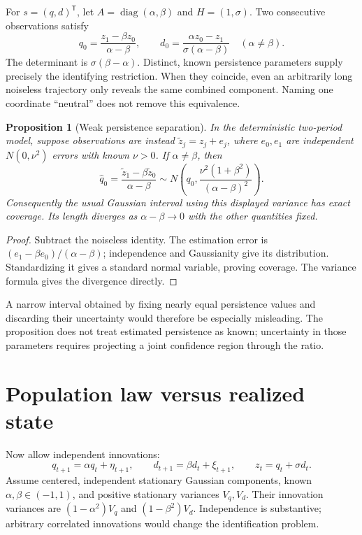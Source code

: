 \documentclass[11pt]{article}
\newtheorem{proposition}[theorem]{Proposition}
\theoremstyle{definition}
\begin{document}
For $s=(q,d)^{\mathsf T}$, let $A=\operatorname{diag}(\alpha,\beta)$ and $H=(1,\sigma)$. Two consecutive observations satisfy
\[
 q_0=\frac{z_1-\beta z_0}{\alpha-\beta},\qquad
 d_0=\frac{\alpha z_0-z_1}{\sigma(\alpha-\beta)}
 \quad(\alpha\ne\beta).
\]
The determinant is $\sigma(\beta-\alpha)$. Distinct, known persistence parameters supply precisely the identifying restriction. When they coincide, even an arbitrarily long noiseless trajectory only reveals the same combined component. Naming one coordinate ``neutral'' does not remove this equivalence.

\begin{proposition}[Weak persistence separation]
In the deterministic two-period model, suppose observations are instead $\widetilde z_j=z_j+e_j$, where $e_0,e_1$ are independent $N(0,\nu^2)$ errors with known $\nu>0$. If $\alpha\ne\beta$, then
\[
 \widehat q_0=\frac{\widetilde z_1-\beta\widetilde z_0}{\alpha-\beta}
 \sim N\left(q_0,\frac{\nu^2(1+\beta^2)}{(\alpha-\beta)^2}\right).
\]
Consequently the usual Gaussian interval using this displayed variance has exact coverage. Its length diverges as $\alpha-\beta\to0$ with the other quantities fixed.
\end{proposition}
\begin{proof}
Subtract the noiseless identity. The estimation error is $(e_1-\beta e_0)/(\alpha-\beta)$; independence and Gaussianity give its distribution. Standardizing it gives a standard normal variable, proving coverage. The variance formula gives the divergence directly.
\end{proof}
A narrow interval obtained by fixing nearly equal persistence values and discarding their uncertainty would therefore be especially misleading. The proposition does not treat estimated persistence as known; uncertainty in those parameters requires projecting a joint confidence region through the ratio.

\section*{Population law versus realized state}
Now allow independent innovations:
\[
 q_{t+1}=\alpha q_t+\eta_{t+1},\qquad
 d_{t+1}=\beta d_t+\xi_{t+1},\qquad z_t=q_t+\sigma d_t.
\]
Assume centered, independent stationary Gaussian components, known $\alpha,\beta\in(-1,1)$, and positive stationary variances $V_q,V_d$. Their innovation variances are $(1-\alpha^2)V_q$ and $(1-\beta^2)V_d$. Independence is substantive; arbitrary correlated innovations would change the identification problem.
\end{document}
